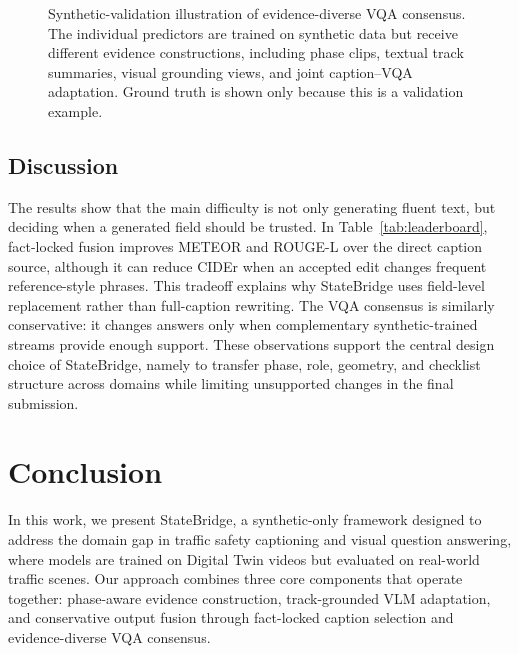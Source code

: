 \documentclass[runningheads]{llncs}
\begin{document}
\begin{figure}[h!]
    \vspace{0.55em}
    \noindent

    \endgroup
    \caption{Synthetic-validation illustration of evidence-diverse VQA consensus. The individual predictors are trained on synthetic data but receive different evidence constructions, including phase clips, textual track summaries, visual grounding views, and joint caption--VQA adaptation. Ground truth is shown only because this is a validation example.}
    \label{fig:vqa_consensus}
\end{figure}


\subsection{Discussion}
The results show that the main difficulty is not only generating fluent text, but deciding when a generated field should be trusted. In Table~\ref{tab:leaderboard}, fact-locked fusion improves METEOR and ROUGE-L over the direct caption source, although it can reduce CIDEr when an accepted edit changes frequent reference-style phrases. This tradeoff explains why StateBridge uses field-level replacement rather than full-caption rewriting. The VQA consensus is similarly conservative: it changes answers only when complementary synthetic-trained streams provide enough support. These observations support the central design choice of StateBridge, namely to transfer phase, role, geometry, and checklist structure across domains while limiting unsupported changes in the final submission.

\section{Conclusion}
In this work, we present StateBridge, a synthetic-only framework designed to address the domain gap in traffic safety captioning and visual question answering, where models are trained on Digital Twin videos but evaluated on real-world traffic scenes. Our approach combines three core components that operate together: phase-aware evidence construction, track-grounded VLM adaptation, and conservative output fusion through fact-locked caption selection and evidence-diverse VQA consensus.
\end{document}
